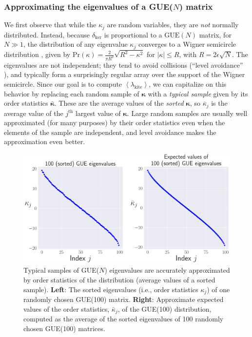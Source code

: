 \documentclass[aps,pra, twocolumn]{revtex4-1}
\newcommand{\expect}[1]{\ensuremath{\left\langle#1\right\rangle}}
\newcommand{\bvec}[1]{\boldsymbol{#1}}
\begin{document}
\subsubsection{Approximating the eigenvalues of a GUE($N$) matrix}
We first observe that while the $\kappa_j$ are random variables, they are \emph{not} normally distributed.  Instead, because $\delta_{\mathrm{ker}}$ is proportional to a $\mathrm{GUE}(N)$ matrix, for $N\gg1$, the distribution of any eigenvalue $\kappa_{j}$
converges to a Wigner semicircle distribution \cite{Wigner1958}, given by $\mathrm{Pr}(\kappa) = \frac{2}{\pi R^{2}}\sqrt{R^{2}-\kappa^{2}}$ for $|\kappa| \leq R$, with $R = 2\epsilon\sqrt{N}$.  The eigenvalues are not independent; they tend to avoid collisions (``level avoidance'' \cite{Tao2013}), 
and typically form a surprisingly regular array over the support of the Wigner semicircle.  Since our goal is to compute $\expect{\lambda_{\mathrm{kite}}}$, we can capitalize on this behavior by replacing each random sample of $\bvec{\kappa}$ with a 
\emph{typical sample} given by its order statistics $\bar{\bvec{\kappa}}$.  These are the average values of the \emph{sorted} 
$\bvec{\kappa}$, so $\overline{\kappa}_j$ is the average value of the $j^{\mathrm{th}}$ largest value of $\bvec{\kappa}$.  Large random samples 
are usually well approximated (for many purposes) by their order statistics even when the elements of the sample are 
independent, and level avoidance makes the approximation even better. 

\begin{figure}
\includegraphics[width=\columnwidth]{Images/Figure_7.pdf}
\caption{Typical samples of GUE($N$) eigenvalues are accurately approximated by order statistics of the distribution (average values of a sorted sample).  \textbf{Left}:  The sorted eigenvalues (i.e., order statistics $\kappa_{j}$) of one randomly chosen GUE(100) matrix.  \textbf{Right}:  Approximate expected values of the order statistics, $\bar{\kappa}_{j}$, of the GUE(100) distribution, computed as the average of the sorted eigenvalues of 100 randomly chosen GUE(100) matrices.}
\label{fig:orderstatistics1}
\end{figure}
\end{document}
